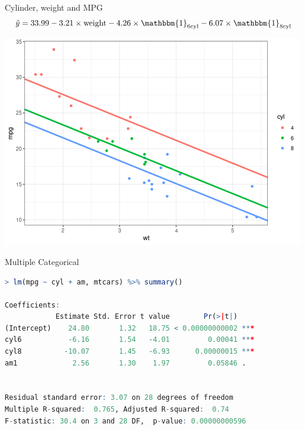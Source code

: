 \documentclass{beamer}
\begin{document}
\begin{frame}{Cylinder, weight and MPG}
\begin{align*}
\hat{y} = 33.99 - 3.21 \times \text{weight} - 4.26 \times \mathbbm{1}_{6 \text{cyl}} - 6.07 \times \mathbbm{1}_{8 \text{cyl}}
\end{align*}
\begin{center}
\includegraphics[scale=0.5]{cyl_wt_mpg.png}
\end{center}
\end{frame}



\begin{frame}[fragile]{Multiple Categorical}

\begin{lstlisting}[language=R]
> lm(mpg ~ cyl + am, mtcars) %>% summary()

Coefficients:
            Estimate Std. Error t value        Pr(>|t|)    
(Intercept)    24.80       1.32   18.75 < 0.00000000002 ***
cyl6           -6.16       1.54   -4.01         0.00041 ***
cyl8          -10.07       1.45   -6.93      0.00000015 ***
am1             2.56       1.30    1.97         0.05846 .  


Residual standard error: 3.07 on 28 degrees of freedom
Multiple R-squared:  0.765,	Adjusted R-squared:  0.74 
F-statistic: 30.4 on 3 and 28 DF,  p-value: 0.00000000596
\end{lstlisting}

\end{frame}
\end{document}
